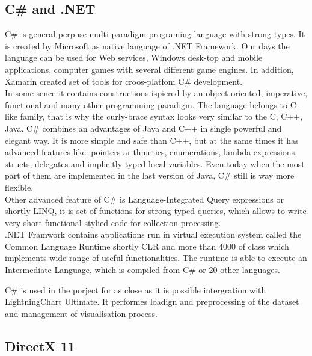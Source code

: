 \documentclass[twoside, english, 11pt]{report}
\begin{document}
\subsection{C\# and .NET}
C\# is general perpuse  multi-paradigm programing language with strong types. It is created by Microsoft as native language of .NET Framework. Our days the language can be used for Web services, Windows desk-top and mobile applications, computer games with several different game engines. In addition, Xamarin created set of tools for croos-platfom C\# development.\\

In some sence it contains constructions ispiered by an object-oriented, imperative, functional and many other programming paradigm. The language belongs to C-like family, that is why the curly-brace syntax looks very similar to the C, C++, Java.  C\# combines an advantages of Java and C++ in single powerful and elegant way. It is more simple and safe than C++, but at the same times it has advanced features like: pointers arithmetics, enumerations, lambda expressions, structs, delegates and implicitly typed local variables. Even today when the most part of them are implemented in the last version of Java, C\# still is way more flexible.\\

Other advanced feature of C\# is Language-Integrated Query expressions or shortly LINQ, it is set of functions for strong-typed queries, which allows to write very short functional stylied code for collection processing.\\

.NET Framwork contains applications run in virtual execution system called the Common Language Runtime shortly CLR and more than 4000 of class which implements wide range of useful functionalities. The runtime is able to execute an Intermediate Language, which is compiled from C\# or 20 other languages.

C\# is used in the porject for as close as it is possible intergration with LightningChart Ultimate. It performes loadign and preprocessing of the dataset and management of visualisation process.

\subsection{DirectX 11}
\end{document}
